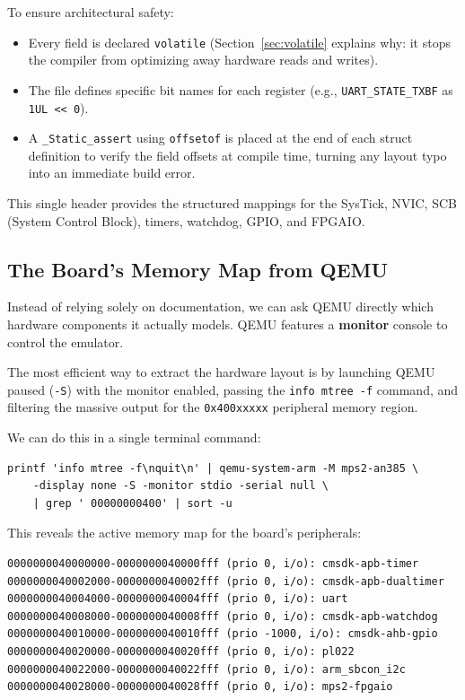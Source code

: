 To ensure architectural safety:
\begin{itemize}
    \item Every field is declared \texttt{volatile} (Section~\ref{sec:volatile} explains why: it stops the compiler from optimizing away hardware reads and writes).
    \item The file defines specific bit names for each register (e.g., \texttt{UART\_STATE\_TXBF} as \texttt{1UL << 0}).
    \item A \texttt{\_Static\_assert} using \texttt{offsetof} is placed at the end of each struct definition to verify the field offsets at compile time, turning any layout typo into an immediate build error.
\end{itemize}
This single header provides the structured mappings for the SysTick, NVIC, SCB (System Control Block), timers, watchdog, GPIO, and FPGAIO.

\subsection{The Board's Memory Map from QEMU}
Instead of relying solely on documentation, we can ask QEMU directly which hardware components it actually models. QEMU features a \textbf{monitor} console to control the emulator. 

The most efficient way to extract the hardware layout is by launching QEMU paused (\texttt{-S}) with the monitor enabled, passing the \texttt{info mtree -f} command, and filtering the massive output for the \texttt{0x400xxxxx} peripheral memory region. 

We can do this in a single terminal command:
\begin{lstlisting}
printf 'info mtree -f\nquit\n' | qemu-system-arm -M mps2-an385 \
    -display none -S -monitor stdio -serial null \
    | grep ' 00000000400' | sort -u
\end{lstlisting}

This reveals the active memory map for the board's peripherals:
\begin{verbatim}
0000000040000000-0000000040000fff (prio 0, i/o): cmsdk-apb-timer
0000000040002000-0000000040002fff (prio 0, i/o): cmsdk-apb-dualtimer
0000000040004000-0000000040004fff (prio 0, i/o): uart
0000000040008000-0000000040008fff (prio 0, i/o): cmsdk-apb-watchdog
0000000040010000-0000000040010fff (prio -1000, i/o): cmsdk-ahb-gpio
0000000040020000-0000000040020fff (prio 0, i/o): pl022
0000000040022000-0000000040022fff (prio 0, i/o): arm_sbcon_i2c
0000000040028000-0000000040028fff (prio 0, i/o): mps2-fpgaio
\end{verbatim}


